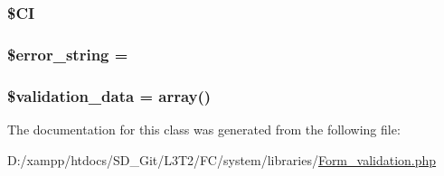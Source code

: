 \subsubsection[{\$\+C\+I}]{\setlength{\rightskip}{0pt plus 5cm}\$C\+I\hspace{0.3cm}{\ttfamily [protected]}}\label{class_c_i___form__validation_ae0314d046ddf7fcfaec03222977427d3}
\hypertarget{class_c_i___form__validation_a22323b47b58139586ed855d04138d212}{}
\subsubsection[{\$error\+\_\+string}]{\setlength{\rightskip}{0pt plus 5cm}\${\bf error\+\_\+string} = \textquotesingle{}\textquotesingle{}\hspace{0.3cm}{\ttfamily [protected]}}\label{class_c_i___form__validation_a22323b47b58139586ed855d04138d212}
\hypertarget{class_c_i___form__validation_af1df05337bb40c1d30c3d8c62fe8696c}{}
\subsubsection[{\$validation\+\_\+data}]{\setlength{\rightskip}{0pt plus 5cm}\$validation\+\_\+data = array()}\label{class_c_i___form__validation_af1df05337bb40c1d30c3d8c62fe8696c}


The documentation for this class was generated from the following file\+:\begin{DoxyCompactItemize}
\item 
D\+:/xampp/htdocs/\+S\+D\+\_\+\+Git/\+L3\+T2/\+F\+C/system/libraries/\hyperlink{_form__validation_8php}{Form\+\_\+validation.\+php}\end{DoxyCompactItemize}
